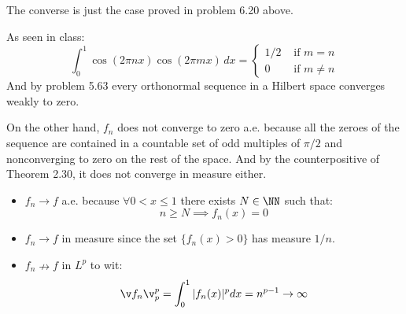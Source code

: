 The converse is just the case proved in problem 6.20 above.

As seen in class:
\[
    \int_0^{1}\cos(2\pi nx)\cos(2\pi mx)\, dx=\begin{cases}
        1/2 & \text{ if } m=n\\
        0   & \text{ if } m\neq n
\end{cases}\]
And by problem 5.63 every orthonormal sequence in a Hilbert space converges weakly to zero.

On the other hand, $f_n$ does not converge to zero a.e. because all the zeroes of the sequence are contained in a countable set of odd multiples of $\pi/2$ and nonconverging to zero on the rest of the space. And by the counterpositive of Theorem 2.30, it does not converge in measure either.

\begin{itemize}
    \item $f_n \to f$ a.e. because $\forall 0<x\leq 1$ there exists $N\in\NN$ such that:
        $$n\geq N \implies f_n(x)=0$$
    \item $f_n\to f$ in measure since the set $\{ f_n(x)>0\}$ has measure $1/n$.
    \item $f_n\nrightarrow f$ in $L^p$ to wit:
        $$\v f_n\v_p^p = \int_0^1 |f_n(x)|^pdx = n^{p-1}\to \infty$$
\end{itemize}
